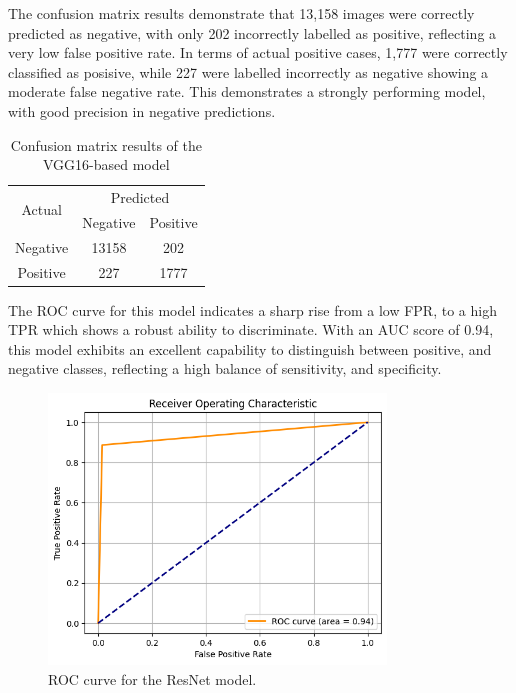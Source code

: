 \documentclass[../main]{subfiles}
\begin{document}
The confusion matrix results demonstrate that 13,158 images were correctly predicted as negative, with only 202 incorrectly labelled as positive, reflecting a very low false positive rate. In terms of actual positive cases, 1,777 were correctly classified as posisive, while 227 were labelled incorrectly as negative showing a moderate false negative rate. This demonstrates a strongly performing model, with good precision in negative predictions.

\begin{table}[h]
    \centering
    \begin{tabular}{|c|c|c|}
        \hline
        \multirow{2}{*}{Actual} & \multicolumn{2}{c|}{Predicted} \\ \cline{2-3}
                                & Negative         & Positive         \\ \hline
        Negative                & 13158            & 202              \\ \hline
        Positive                & 227              & 1777              \\ \hline
    \end{tabular}
    \caption{Confusion matrix results of the VGG16-based model}
    \label{tab:confusion-matrix-vgg16}
\end{table}

The ROC curve for this model indicates a sharp rise from a low FPR, to a high TPR which shows a robust ability to discriminate. With an AUC score of 0.94, this model exhibits an excellent capability to distinguish between positive, and negative classes, reflecting a high balance of sensitivity, and specificity.

\begin{figure}[h]
	\centering
	\includegraphics[width=0.8\textwidth]{assets/roc_resnet.png}
	\caption{ROC curve for the ResNet model.}
	\label{fig:prototype_architecture}
\end{figure}
\end{document}
